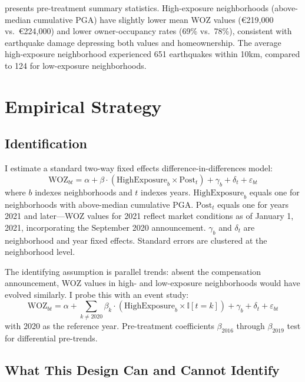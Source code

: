 \documentclass[12pt]{article}
\newcommand{\ind}{\mathbb{I}}
\begin{document}


 presents pre-treatment summary statistics. High-exposure neighborhoods (above-median cumulative PGA) have slightly lower mean WOZ values (\euro 219,000 vs.\ \euro 224,000) and lower owner-occupancy rates (69\% vs.\ 78\%), consistent with earthquake damage depressing both values and homeownership. The average high-exposure neighborhood experienced 651 earthquakes within 10km, compared to 124 for low-exposure neighborhoods.

\section{Empirical Strategy}

\subsection{Identification}

I estimate a standard two-way fixed effects difference-in-differences model:
\begin{equation}
\text{WOZ}_{bt} = \alpha + \beta \cdot (\text{HighExposure}_b \times \text{Post}_t) + \gamma_b + \delta_t + \varepsilon_{bt}
\label{eq:did}
\end{equation}
where $b$ indexes neighborhoods and $t$ indexes years. $\text{HighExposure}_b$ equals one for neighborhoods with above-median cumulative PGA. $\text{Post}_t$ equals one for years 2021 and later---WOZ values for 2021 reflect market conditions as of January 1, 2021, incorporating the September 2020 announcement. $\gamma_b$ and $\delta_t$ are neighborhood and year fixed effects. Standard errors are clustered at the neighborhood level.

The identifying assumption is parallel trends: absent the compensation announcement, WOZ values in high- and low-exposure neighborhoods would have evolved similarly. I probe this with an event study:
\begin{equation}
\text{WOZ}_{bt} = \alpha + \sum_{k \neq 2020} \beta_k \cdot (\text{HighExposure}_b \times \ind[t = k]) + \gamma_b + \delta_t + \varepsilon_{bt}
\label{eq:es}
\end{equation}
with 2020 as the reference year. Pre-treatment coefficients $\beta_{2016}$ through $\beta_{2019}$ test for differential pre-trends.

\subsection{What This Design Can and Cannot Identify}
\end{document}
